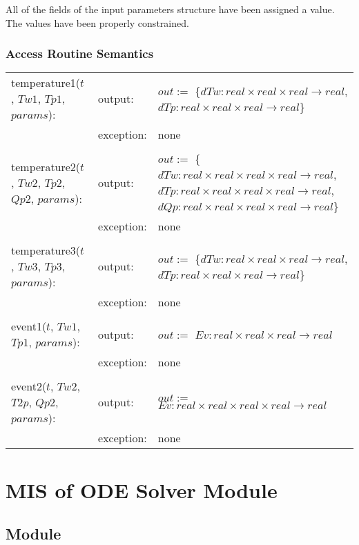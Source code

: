 \documentclass[12pt]{article}
\begin{document}
All of the fields of the input parameters structure have been assigned a
value. The values have been properly constrained.

\subsubsection{Access Routine Semantics}

\begin{center}
\begin{tabular}{l l p{6cm}}
temperature1($t$, $Tw1$, $Tp1$, $params$): & output: & $out :=$ \{$dTw: real \times real \times real \rightarrow real$, $dTp: real \times real \times real \rightarrow real$\} \\
& exception: & none \\ \\
temperature2($t$, $Tw2$, $Tp2$, $Qp2$, $params$): & output: & $out :=$ \{$dTw: real \times real \times real \times real \rightarrow real$, $dTp: real \times real \times real \times real \rightarrow real$, $dQp: real \times real \times real \times real \rightarrow real$\} \\
& exception: & none \\ \\
temperature3($t$, $Tw3$, $Tp3$, $params$): & output: & $out :=$ \{$dTw: real \times real \times real \rightarrow real$, $dTp: real \times real \times real \rightarrow real$\} \\
& exception: & none \\ \\
event1($t$, $Tw1$, $Tp1$, $params$): & output: & $out :=$ $Ev: real \times real \times real \rightarrow real$ \\ 
& exception: & none \\ \\
event2($t$, $Tw2$, $T2p$, $Qp2$, $params$): & output: & $out :=$ $Ev: real \times real \times real \times real \rightarrow real$ \\
& exception: & none \\
\end{tabular}
\end{center}

\section{MIS of ODE Solver Module} \label{ODE}

\subsection{Module}
\end{document}
